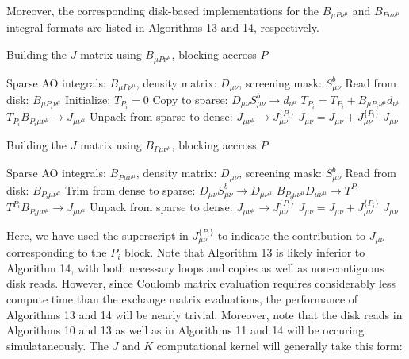 \noindent Moreover, the corresponding disk-based implementations for the $B_{\mu P \nu^\mu}$ and $B_{P \mu \nu^\mu}$ integral
formats are listed in Algorithms 13 and 14, respectively.

\begin{algorithm}[H]
\caption{Building the $J$ matrix using $B_{\mu P \nu^\mu}$, blocking accross $P$}
\begin{algorithmic}
\REQUIRE Sparse AO integrals: $B_{\mu P \nu^{\mu}}$, density matrix: $D_{\mu \nu}$, screening mask: $S_{\mu \nu}^b$
    \STATE Read from disk: $B_{\mu P_i \nu^{\mu}}$
    \STATE Initialize: $T_{P_i} = 0$
        \STATE Copy to sparse: $D_{\mu \nu}S_{\mu \nu}^b \rightarrow d_{\nu^{\mu} }$
        \STATE $T_{P_i} = T_{P_i} + B_{\mu P_i \nu^{\mu}}d_{\nu^{\mu}}$
    \ENDFOR    
    \STATE $T_{P_i} B_{P_i \mu \nu^{\mu}} \rightarrow J_{\mu \nu^{\mu}} $
    \STATE Unpack from sparse to dense: $J_{\mu \nu^{\mu}} \rightarrow J_{\mu \nu}^{\{P_i\}}$
    \STATE $J_{\mu \nu} = J_{\mu \nu} + J_{\mu \nu}^{\{P_i\}}$
\ENDFOR
\RETURN $J_{\mu \nu}$
\end{algorithmic}
\end{algorithm}

\begin{algorithm}[H]
\caption{Building the $J$ matrix using $B_{P \mu \nu^\mu}$, blocking accross $P$}
\begin{algorithmic}
\REQUIRE Sparse AO integrals: $B_{P \mu \nu^{\mu}}$, density matrix: $D_{\mu \nu}$, screening mask: $S_{\mu \nu}^b$
    \STATE Read from disk: $B_{P_i \mu \nu^{\mu}}$
    \STATE Trim from dense to sparse: $D_{\mu \nu}S_{\mu \nu}^b \rightarrow D_{\mu \nu^{\mu} }$
    \STATE $B_{P_i \mu\nu^{\mu}} D_{\mu \nu^{\mu}} \rightarrow T^{P_i}$
    \STATE $T^{P_i} B_{P_i \mu \nu^{\mu}} \rightarrow J_{\mu \nu^{\mu}} $
    \STATE Unpack from sparse to dense: $J_{\mu \nu^{\mu}} \rightarrow J_{\mu \nu}^{\{P_i\}}$
    \STATE $J_{\mu \nu} = J_{\mu \nu} + J_{\mu \nu}^{\{P_i\}}$
\ENDFOR
\RETURN $J_{\mu \nu}$
\end{algorithmic}
\end{algorithm}

\noindent Here, we have used the superscript in $J_{\mu \nu}^{\{P_i\}}$ to indicate the contribution to 
$J_{\mu \nu}$ corresponding to the $P_i$ block.
Note that Algorithm 13 is likely inferior to Algorithm 14, with both necessary loops and copies as well as non-contiguous disk reads.
However, since Coulomb matrix evaluation requires considerably less compute time than the exchange matrix evaluations, 
the performance of Algorithms 13 and 14 will be nearly trivial. Moreover, note that the disk reads in Algorithms 10 and 13 as well as 
in Algorithms 11 and 14 will be occuring simulataneously. The $J$ and $K$ computational kernel will generally take this form:

